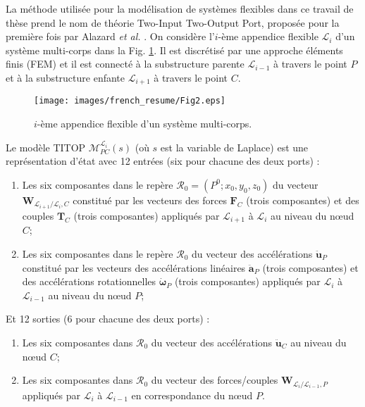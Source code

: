 La m\'ethode utilis\'ee pour la mod\'elisation de syst\`emes flexibles dans ce travail de th\`ese prend le nom de th\'eorie Two-Input Two-Output Port, propos\'ee pour la premi\`ere fois par Alazard \textit{et al.} \cite{ alazard2015two}.  On consid\`ere l'$i$-\`eme appendice flexible $\mathcal{L}_i$ d'un syst\`eme multi-corps dans la Fig. \ref{fig:TITOP_fr}.
Il est discr\'etis\'e par une approche \'el\'ements finis (FEM) et il est connecté \`a la substructure parente $\mathcal{L}_{i-1}$ \`a travers le point $P$ et \`a la substructure enfante $\mathcal{L}_{i+1}$ \`a travers le point $C$. 

\begin{figure}[ht]
\centering
\texttt{[image: images/french\_resume/Fig2.eps]} %
\caption{$i$-\`eme appendice flexible d'un syst\`eme multi-corps.} 
\label{fig:TITOP_fr}
\end{figure}

Le mod\`ele TITOP $\mathcal{M}_{PC}^{\mathcal{L}_i}(s)$ (o\`u $s$ est la variable de Laplace) est une repr\'esentation d'\'etat avec 12 entrées (six pour chacune des deux ports) :
\begin{enumerate}  
\item Les six composantes dans le rep\`ere $\mathcal{R}_0=(P^0 ;x_0,y_0,z_0)$ du vecteur $\mathbf{W}_{\mathcal{L}_{i+1}/\mathcal{L}_i,C}$ constitu\'e par les vecteurs des forces $\mathbf{F}_C$ (trois composantes) et des couples $\mathbf{T}_C$ (trois composantes) appliqu\'es par $\mathcal{L}_{i+1}$ \`a $\mathcal{L}_i$ au niveau du nœud $C$; 
\item Les six composantes dans le rep\`ere $\mathcal{R}_0$ du vecteur des acc\'el\'erations $\ddot{\mathbf{u}}_{P}$ constitu\'e par les vecteurs des acc\'el\'erations  lin\'eaires $\ddot{\mathbf{a}}_{P}$ (trois composantes) et des acc\'el\'erations rotationnelles $\dot{\bm{\omega}}_{P} $  (trois composantes) appliqu\'es par $\mathcal{L}_{i}$ \`a $\mathcal{L}_{i-1}$ au niveau du nœud $P$;
\end{enumerate}  
Et 12 sorties (6 pour chacune des deux ports) :
\begin{enumerate}
\item Les six composantes dans $\mathcal{R}_0$ du vecteur des acc\'el\'erations $\ddot{\mathbf{u}}_{C}$ au niveau du nœud $C$;
\item Les six composantes dans $\mathcal{R}_0$ du vecteur des forces/couples $\mathbf{W}_{\mathcal{L}_{i}/\mathcal{L}_{i-1},P}$ appliqu\'es par $\mathcal{L}_i$ \`a $\mathcal{L}_{i-1}$ en correspondance du nœud $P$.  
\end{enumerate}

